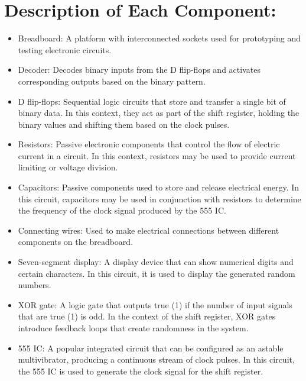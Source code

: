 \documentclass[12pt,onecolumn,notitlepage]{article}
\begin{document}
  \section*{Description of Each Component:}
\begin{itemize}
\setlength\itemsep{0pt}
\item Breadboard: A platform with interconnected sockets used for prototyping and testing electronic circuits.

\item Decoder: Decodes binary inputs from the D flip-flops and activates corresponding outputs based on the binary pattern.

\item D flip-flops: Sequential logic circuits that store and transfer a single bit of binary data. In this context, they act as part of the shift register, holding the binary values and shifting them based on the clock pulses.

\item Resistors: Passive electronic components that control the flow of electric current in a circuit. In this context, resistors may be used to provide current limiting or voltage division.

\item Capacitors: Passive components used to store and release electrical energy. In this circuit, capacitors may be used in conjunction with resistors to determine the frequency of the clock signal produced by the 555 IC.

\item Connecting wires: Used to make electrical connections between different components on the breadboard.

\item Seven-segment display: A display device that can show numerical digits and certain characters. In this circuit, it is used to display the generated random numbers.

\item XOR gate: A logic gate that outputs true (1) if the number of input signals that are true (1) is odd. In the context of the shift register, XOR gates introduce feedback loops that create randomness in the system.

\item 555 IC: A popular integrated circuit that can be configured as an astable multivibrator, producing a continuous stream of clock pulses. In this circuit, the 555 IC is used to generate the clock signal for the shift register.
\end{itemize}
\end{document}
